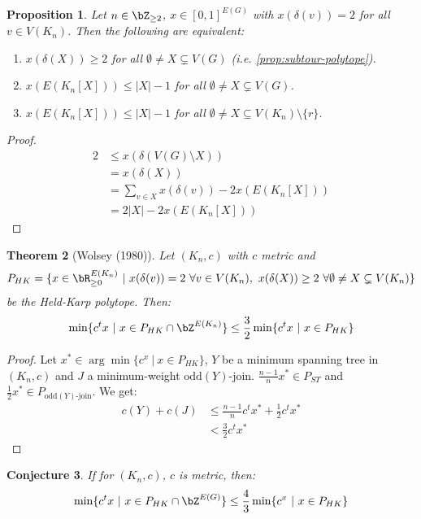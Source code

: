 \documentclass[11pt, a4paper]{article}
\newcommand{\abs}[1]{\left\lvert#1\right\rvert}
\newcommand{\set}[1]{\{#1\}}
\newtheorem{theorem}{Theorem}[section]
\newtheorem{prop}[theorem]{Proposition}
\newtheorem{conjecture}[theorem]{Conjecture}
\theoremstyle{remark}
\theoremstyle{definition}
\begin{document}
\begin{prop}
	Let $n\in\bZ_{\geq2}$, $x\in[0,1]^{E(G)}$ with $x(\delta(v))=2$ for all
	$v\in V(K_n)$. Then the following are equivalent:
	\begin{enumerate}
		\item $x(\delta(X))\geq2$ for all $\emptyset \neq X\subsetneq V(G)$
		(i.e. \ref{prop:subtour-polytope}).
		\item $x(E(K_n[X]))\leq \abs{X}-1$ for all $\emptyset\neq X\subsetneq V(G)$.
		\item $x(E(K_n[X]))\leq \abs{X}-1$ for all  $\emptyset\neq X\subseteq V(K_n)\setminus\set{r}$.
	\end{enumerate}
\end{prop}
\begin{proof}
	\begin{align*}
		2 & \leq x(\delta(V(G)\setminus X))          \\
		  & =x(\delta(X))                            \\
		  & =\sum_{v\in X}x(\delta(v))-2x(E(K_n[X])) \\
		  & =2\abs{X}-2x(E(K_n[X]))
	\end{align*}
\end{proof}

\begin{theorem}[Wolsey (1980)]
	Let $(K_n,c)$ with $c$ metric and
	\[P_{HK}=\set{x\in\bR^{E(K_n)}_{\geq0}\ |\ x(\delta(v))=2\ \forall v\in V(K_n),
			\ x(\delta(X))\geq 2\ \forall \emptyset\neq X\subsetneq V(K_n)}\]
	be the Held-Karp polytope. Then:
	\[\min\set{c^tx\ |\ x\in P_{HK}\cap\bZ^{E(K_n)}}\leq \frac{3}{2}
		\min\set{c^tx\ |\ x\in P_{HK}}\]
\end{theorem}
\begin{proof}
	Let $x^*\in \arg\min\set{c^x\ |\ x\in P_{HK}}$, $Y$ be a minimum
	spanning tree in $(K_n,c)$ and $J$ a minimum-weight $\mathrm{odd}(Y)$-join.
	$\frac{n-1}{n}x^*\in P_{ST}$ and $\frac{1}{2}x^*\in P_{\mathrm{odd}(Y)\text{-join}}$.
	We get:
	\begin{align*}
		c(Y)+c(J) & \leq \frac{n-1}{n}c^tx^*+\frac{1}{2}c^tx^* \\
		          & <\frac{3}{2}c^tx^*
	\end{align*}
\end{proof}

\begin{conjecture}
	If for $(K_n,c)$, $c$ is metric, then:
	\[\min\set{c^tx\ |\ x\in P_{HK}\cap\bZ^{E(G)}}\leq \frac{4}{3}\min\set{c^x\ |\ x\in P_{HK}}\]
\end{conjecture}
\end{document}
